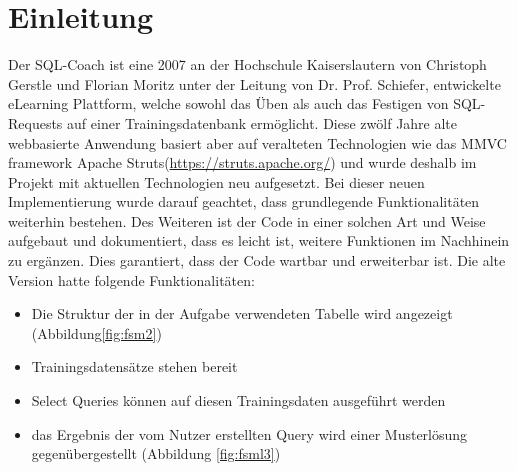 \documentclass[fleqn,10pt,ngerman]{SelfArx}
\affiliation{\textit{Hochschule Kaiserslautern}} %
\affiliation{\textbf{Corresponding author}: Braun Daniel} %
\begin{document}
	
	\flushbottom %
	
	\maketitle %
	
	\tableofcontents %
	
	\thispagestyle{empty} %
	
	
	\newpage
	\section{Einleitung} %
	

	
	Der SQL-Coach ist eine 2007 an der Hochschule Kaiserslautern von Christoph Gerstle und Florian Moritz unter der Leitung von Dr. Prof. Schiefer, entwickelte eLearning Plattform, welche sowohl das Üben als auch das Festigen von SQL-Requests auf einer Trainingsdatenbank ermöglicht.  Diese zwölf Jahre alte webbasierte Anwendung basiert aber auf veralteten Technologien wie das MMVC framework Apache Struts(\url{https://struts.apache.org/}) und wurde deshalb im Projekt mit aktuellen Technologien neu aufgesetzt. 
	Bei dieser neuen Implementierung wurde darauf geachtet, dass grundlegende Funktionalitäten weiterhin bestehen. Des Weiteren ist der Code in einer solchen Art und Weise aufgebaut und dokumentiert, dass es leicht ist, weitere Funktionen im Nachhinein zu ergänzen. Dies garantiert, dass der Code wartbar und erweiterbar ist.
	\newpage
	Die alte Version hatte folgende Funktionalitäten:
\begin{itemize}
	\item Die Struktur der in der Aufgabe verwendeten Tabelle wird angezeigt (Abbildung\ref{fig:fsm2})
	\item Trainingsdatensätze stehen bereit
	\item Select Queries können auf diesen Trainingsdaten ausgeführt werden
	\item das Ergebnis der vom Nutzer erstellten Query wird einer Musterlösung gegenübergestellt (Abbildung \ref{fig:fsml3})
\end{itemize}
	
\end{document}
